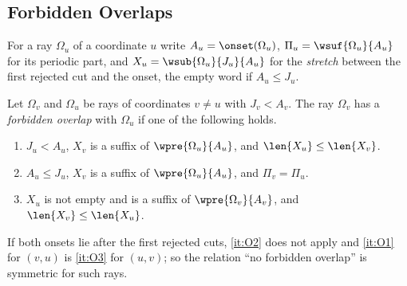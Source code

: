\subsection{Forbidden Overlaps}\label{app:tails-overlaps}

For a ray $\Omega_u$ of a coordinate $u$ write $A_u=\onset(\Omega_u)$,
$\Pi_u=\wsuf{\Omega_u}{A_u}$ for its periodic part, and
$X_u=\wsub{\Omega_u}{J_u}{A_u}$ for the \emph{stretch} between the first
rejected cut and the onset, the empty word if $A_u\le J_u$.

\begin{definition}\label{def:overlaps}
Let $\Omega_v$ and $\Omega_u$ be rays of coordinates $v\ne u$ with
$J_v<A_v$. The ray $\Omega_v$ has a \emph{forbidden overlap} with
$\Omega_u$ if one of the following holds.
\begin{enumerate}[label=\textup{(O\arabic*)}]
\item\label{it:O1} $J_u<A_u$, $X_v$ is a suffix of $\wpre{\Omega_u}{A_u}$,
  and $\len{X_u}\le\len{X_v}$.
\item\label{it:O2} $A_u\le J_u$, $X_v$ is a suffix of
  $\wpre{\Omega_u}{A_u}$, and $\Pi_v=\Pi_u$.
\item\label{it:O3} $X_u$ is not empty and is a suffix of
  $\wpre{\Omega_v}{A_v}$, and $\len{X_v}\le\len{X_u}$.
\end{enumerate}
\end{definition}

If both onsets lie after the first rejected cuts, \ref{it:O2} does not
apply and \ref{it:O1} for $(v,u)$ is \ref{it:O3} for $(u,v)$; so the
relation ``no forbidden overlap'' is symmetric for such rays.

